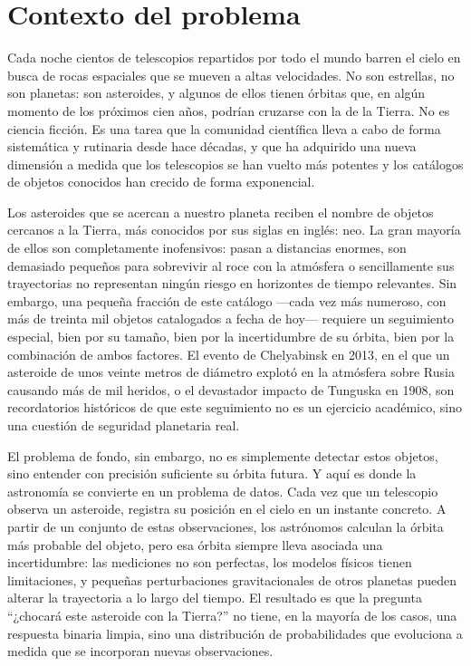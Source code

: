 \documentclass[12pt]{report} %
\begin{document}
\section{Contexto del problema}
 
Cada noche cientos de telescopios repartidos por todo el mundo barren el cielo en busca de rocas espaciales que se mueven a altas velocidades. No son estrellas, no son planetas: son asteroides, y algunos de ellos tienen órbitas que, en algún momento de los próximos cien años, podrían cruzarse con la de la Tierra. No es ciencia ficción. Es una tarea que la comunidad científica lleva a cabo de forma sistemática y rutinaria desde hace décadas, y que ha adquirido una nueva dimensión a medida que los telescopios se han vuelto más potentes y los catálogos de objetos conocidos han crecido de forma exponencial.
 
Los asteroides que se acercan a nuestro planeta reciben el nombre de objetos cercanos a la Tierra, más conocidos por sus siglas en inglés: \gls{neo}. La gran mayoría de ellos son completamente inofensivos: pasan a distancias enormes, son demasiado pequeños para sobrevivir al roce con la atmósfera o sencillamente sus trayectorias no representan ningún riesgo en horizontes de tiempo relevantes. Sin embargo, una pequeña fracción de este catálogo ---cada vez más numeroso, con más de treinta mil objetos catalogados a fecha de hoy--- requiere un seguimiento especial, bien por su tamaño, bien por la incertidumbre de su órbita, bien por la combinación de ambos factores. El evento de Chelyabinsk en 2013, en el que un asteroide de unos veinte metros de diámetro explotó en la atmósfera sobre Rusia causando más de mil heridos, o el devastador impacto de Tunguska en 1908, son recordatorios históricos de que este seguimiento no es un ejercicio académico, sino una cuestión de seguridad planetaria real.
 
El problema de fondo, sin embargo, no es simplemente detectar estos objetos, sino entender con precisión suficiente su órbita futura. Y aquí es donde la astronomía se convierte en un problema de datos. Cada vez que un telescopio observa un asteroide, registra su posición en el cielo en un instante concreto. A partir de un conjunto de estas observaciones, los astrónomos calculan la órbita más probable del objeto, pero esa órbita siempre lleva asociada una incertidumbre: las mediciones no son perfectas, los modelos físicos tienen limitaciones, y pequeñas perturbaciones gravitacionales de otros planetas pueden alterar la trayectoria a lo largo del tiempo. El resultado es que la pregunta ``¿chocará este asteroide con la Tierra?'' no tiene, en la mayoría de los casos, una respuesta binaria limpia, sino una distribución de probabilidades que evoluciona a medida que se incorporan nuevas observaciones.
 
\end{document}
